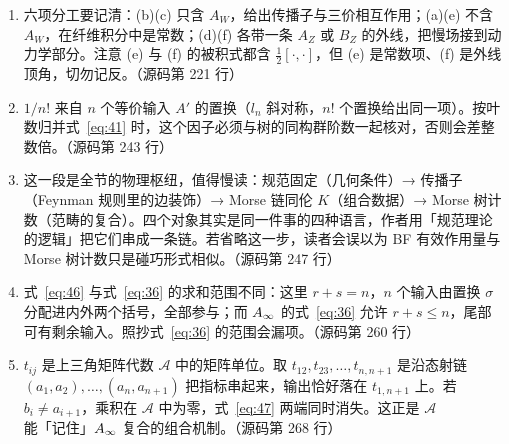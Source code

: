\begin{enumerate}
  \item 六项分工要记清：(b)(c) 只含 $A_W$，给出传播子与三价相互作用；(a)(e) 不含 $A_W$，在纤维积分中是常数；(d)(f) 各带一条 $A_Z$ 或 $B_Z$ 的外线，把慢场接到动力学部分。注意 (e) 与 (f) 的被积式都含 $\frac12[\cdot,\cdot]$，但 (e) 是常数项、(f) 是外线顶角，切勿记反。\hfill{\footnotesize （源码第 221 行）}
  \item $1/n!$ 来自 $n$ 个等价输入 $A'$ 的置换（$l_n$ 斜对称，$n!$ 个置换给出同一项）。按叶数归并式~\eqref{eq:41} 时，这个因子必须与树的同构群阶数一起核对，否则会差整数倍。\hfill{\footnotesize （源码第 243 行）}
  \item 这一段是全节的物理枢纽，值得慢读：规范固定（几何条件）→ 传播子（Feynman 规则里的边装饰）→ Morse 链同伦 $K$（组合数据）→ Morse 树计数（范畴的复合）。四个对象其实是同一件事的四种语言，作者用「规范理论的逻辑」把它们串成一条链。若省略这一步，读者会误以为 BF 有效作用量与 Morse 树计数只是碰巧形式相似。\hfill{\footnotesize （源码第 247 行）}
  \item 式~\eqref{eq:46} 与式~\eqref{eq:36} 的求和范围不同：这里 $r+s=n$，$n$ 个输入由置换 $\sigma$ 分配进内外两个括号，全部参与；而 $A_\infty$ 的式~\eqref{eq:36} 允许 $r+s\le n$，尾部可有剩余输入。照抄式~\eqref{eq:36} 的范围会漏项。\hfill{\footnotesize （源码第 260 行）}
  \item $t_{ij}$ 是上三角矩阵代数 $\mathcal A$ 中的矩阵单位。取 $t_{12},t_{23},\dots,t_{n,n+1}$ 是沿态射链 $(a_1,a_2),\dots,(a_n,a_{n+1})$ 把指标串起来，输出恰好落在 $t_{1,n+1}$ 上。若 $b_i\neq a_{i+1}$，乘积在 $\mathcal A$ 中为零，式~\eqref{eq:47} 两端同时消失。这正是 $\mathcal A$ 能「记住」$A_\infty$ 复合的组合机制。\hfill{\footnotesize （源码第 268 行）}
\end{enumerate}

